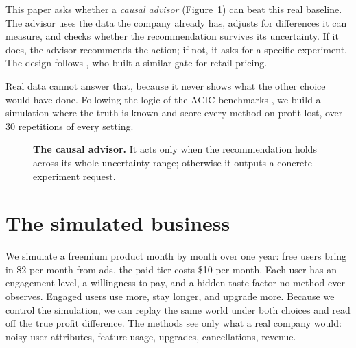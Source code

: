 \documentclass[10pt]{article}
\begin{document}
This paper asks whether a \emph{causal advisor}
(Figure~\ref{fig:flow}) can beat this real baseline. The advisor uses the
data the company already has, adjusts for differences it can measure, and
checks whether the recommendation survives its uncertainty. If it does,
the advisor recommends the action; if not, it asks for a specific
experiment. The design follows \citet{cadahia2026}, who built a similar
gate for retail pricing.

Real data cannot answer that, because it never shows what the other choice
would have done. Following the logic of the ACIC benchmarks \citep{hahn2019},
we build a simulation where the truth is known and score every method on
profit lost, over 30 repetitions of every setting.

\begin{figure}[t]
\centering
{}
\caption{\textbf{The causal advisor.} It acts only when the recommendation
holds across its whole uncertainty range; otherwise it outputs a concrete
experiment request.}
\label{fig:flow}
\end{figure}

\section{The simulated business}
We simulate a freemium product month by month over one year: free users
bring in \$2 per month from ads, the paid tier costs \$10 per month. Each
user has an engagement level, a willingness to pay, and a hidden taste
factor no method ever observes. Engaged users use more, stay longer, and
upgrade more. Because we control the simulation, we can replay the same
world under both choices and read off the true profit difference. The
methods see only what a real company would: noisy user attributes, feature
usage, upgrades, cancellations, revenue.
\end{document}
